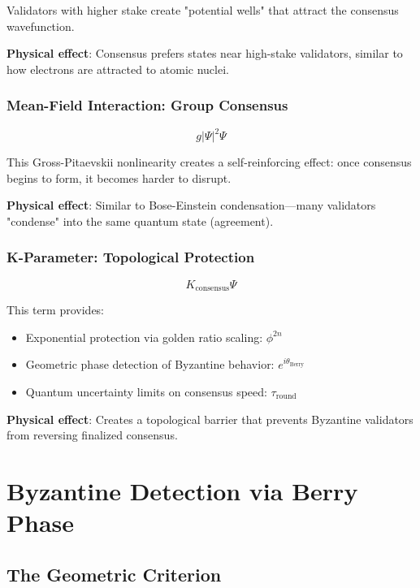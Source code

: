 \documentclass[11pt,a4paper,twoside]{article}
\begin{document}
Validators with higher stake create "potential wells" that attract the consensus wavefunction.

\textbf{Physical effect}: Consensus prefers states near high-stake validators, similar to how electrons are attracted to atomic nuclei.

\subsubsection{Mean-Field Interaction: Group Consensus}

\begin{equation}
g|\Psi|^2\Psi
\end{equation}

This Gross-Pitaevskii nonlinearity creates a self-reinforcing effect: once consensus begins to form, it becomes harder to disrupt.

\textbf{Physical effect}: Similar to Bose-Einstein condensation—many validators "condense" into the same quantum state (agreement).

\subsubsection{K-Parameter: Topological Protection}

\begin{equation}
K_{\text{consensus}}\Psi
\end{equation}

This term provides:
\begin{itemize}
    \item Exponential protection via golden ratio scaling: $\phi^{2n}$
    \item Geometric phase detection of Byzantine behavior: $e^{i\theta_{\text{Berry}}}$
    \item Quantum uncertainty limits on consensus speed: $\tau_{\text{round}}$
\end{itemize}

\textbf{Physical effect}: Creates a topological barrier that prevents Byzantine validators from reversing finalized consensus.

\newpage

\section{Byzantine Detection via Berry Phase}

\subsection{The Geometric Criterion}
\end{document}
